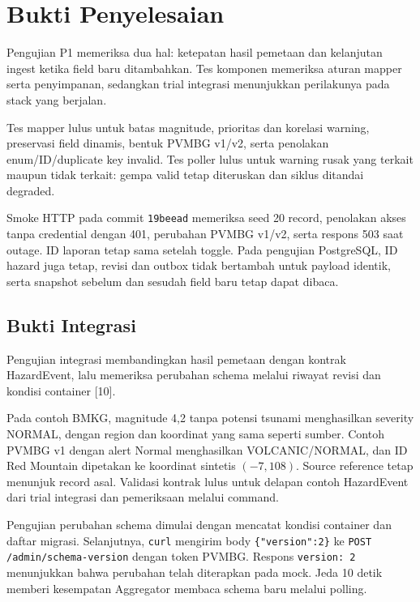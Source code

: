\section{Bukti Penyelesaian}
Pengujian P1 memeriksa dua hal: ketepatan hasil pemetaan dan kelanjutan ingest ketika field baru ditambahkan. Tes komponen memeriksa aturan mapper serta penyimpanan, sedangkan trial integrasi menunjukkan perilakunya pada stack yang berjalan.

Tes mapper lulus untuk batas magnitude, prioritas dan korelasi warning, preservasi field dinamis, bentuk PVMBG v1/v2, serta penolakan enum/ID/duplicate key invalid. Tes poller lulus untuk warning rusak yang terkait maupun tidak terkait: gempa valid tetap diteruskan dan siklus ditandai degraded.

Smoke HTTP pada commit \texttt{19beead} memeriksa seed 20 record, penolakan akses tanpa credential dengan 401, perubahan PVMBG v1/v2, serta respons 503 saat outage. ID laporan tetap sama setelah toggle. Pada pengujian PostgreSQL, ID hazard juga tetap, revisi dan outbox tidak bertambah untuk payload identik, serta snapshot sebelum dan sesudah field baru tetap dapat dibaca.

\subsection{Bukti Integrasi}
Pengujian integrasi membandingkan hasil pemetaan dengan kontrak HazardEvent, lalu memeriksa perubahan schema melalui riwayat revisi dan kondisi container [10].

Pada contoh BMKG, magnitude 4,2 tanpa potensi tsunami menghasilkan severity NORMAL, dengan region dan koordinat yang sama seperti sumber. Contoh PVMBG v1 dengan alert Normal menghasilkan VOLCANIC/NORMAL, dan ID Red Mountain dipetakan ke koordinat sintetis $(-7,108)$. Source reference tetap menunjuk record asal. Validasi kontrak lulus untuk delapan contoh HazardEvent dari trial integrasi dan pemeriksaan melalui command.

Pengujian perubahan schema dimulai dengan mencatat kondisi container dan daftar migrasi. Selanjutnya, \texttt{curl} mengirim body \texttt{\{"version":2\}} ke \texttt{POST /admin/schema-version} dengan token PVMBG. Respons \texttt{version: 2} menunjukkan bahwa perubahan telah diterapkan pada mock. Jeda 10 detik memberi kesempatan Aggregator membaca schema baru melalui polling.


